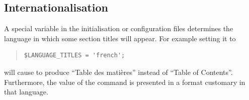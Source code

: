 \subsection{Internationalisation\label{internat}}%
\html{\\}%
A special variable  
in the initialisation or configuration files determines the language 
in which some section titles will appear. For example setting it to 
\begin{quote}
\begin{verbatim}
$LANGUAGE_TITLES = 'french';
\end{verbatim}
\end{quote}
will cause \latextohtml{} to produce ``Table des mati{\`e}res'' instead of
``Table of Contents''.
Furthermore, the value of the  command is presented in a format
customary in that language.

